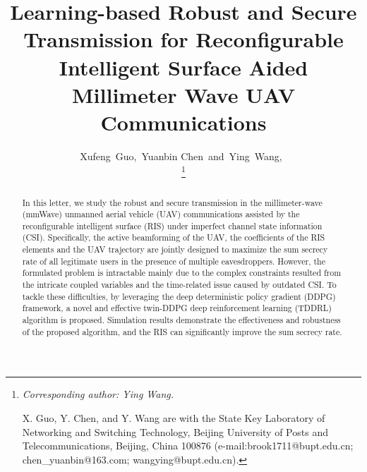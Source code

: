 \documentclass[12pt, draftclsnofoot, onecolumn]{IEEEtran}
\begin{document}
%
\title{Learning-based Robust and Secure Transmission for Reconfigurable Intelligent Surface Aided Millimeter Wave UAV Communications}
%
%
%

\author{Xufeng~Guo,~Yuanbin Chen~and~Ying~Wang,~%
	
\thanks{	
	\textit{Corresponding author: Ying Wang.}
	
	X. Guo, Y. Chen, and Y. Wang are with the State Key Laboratory of Networking and Switching Technology, Beijing University of Posts and Telecommunications, Beijing, China 100876 (e-mail:brook1711@bupt.edu.cn; chen\_yuanbin@163.com; wangying@bupt.edu.cn).%
}}


\maketitle

\begin{abstract}
In this letter, we study the robust and secure transmission in the millimeter-wave (mmWave) unmanned aerial vehicle (UAV) communications assisted by the reconfigurable intelligent surface (RIS) under imperfect channel state information (CSI). Specifically, the active beamforming of the UAV, the coefficients of the RIS elements and the UAV trajectory are jointly designed to maximize the sum secrecy rate of all legitimate users in the presence of multiple eavesdroppers. However, the formulated problem is intractable mainly due to the complex constraints resulted from the intricate coupled variables and the time-related issue caused by outdated CSI.  To tackle these difficulties, by leveraging the deep deterministic policy gradient (DDPG) framework, a novel and effective twin-DDPG deep reinforcement learning (TDDRL) algorithm is proposed. Simulation results demonstrate the effectiveness and robustness of the proposed algorithm, and the RIS can significantly improve the sum secrecy rate.
\end{abstract}
\end{document}
